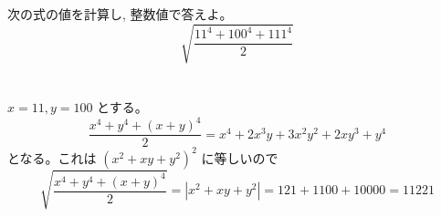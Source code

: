 次の式の値を計算し, 整数値で答えよ。
\[\sqrt{\dfrac{11^4+100^4+111^4}{2}}\]
\enthm
\\
\\
$x=11, y=100$ とする。
\[\dfrac{x^4+y^4+(x+y)^4}{2}=x^4+2x^3y+3x^2y^2+2xy^3+y^4\]
となる。これは $(x^2+xy+y^2)^2$ に等しいので
\[\sqrt{\dfrac{x^4+y^4+(x+y)^4}{2}}=|x^2+xy+y^2|=121+1100+10000=11221\]
